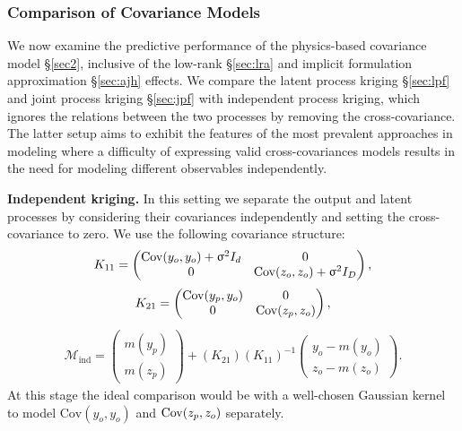 \documentclass[article,ij4uq]{ij4uq}              %
\begin{document}
\subsubsection{Comparison of Covariance Models}\label{sec:512}
\par We now examine the predictive performance of the physics-based covariance model \S \ref{sec2}, inclusive of the low-rank \S \ref{sec:lra} and implicit formulation 
approximation \S \ref{sec:ajh} effects. We compare the latent process kriging \S \ref{sec:lpf} and joint process kriging \S \ref{sec:jpf} with independent process kriging, which ignores the relations between the two processes by removing the cross-covariance. The latter setup aims to exhibit the features of the most prevalent approaches in modeling where a difficulty of expressing valid cross-covariances models results in the need for modeling different observables independently. 
~\\
\par \textbf{Independent kriging.} In this setting we separate the output and latent processes by considering their covariances independently and setting the cross-covariance to zero. We use the following covariance structure:
\begin{align}
    K_{11}=\begin{pmatrix}\mathrm{Cov}(y_{o},y_{o})+\sigma^{2}I_{d} & 0\\0 & {\rm{Cov}}(z_{o},z_{o})+\sigma^{2}I_{D}\end{pmatrix},\label{eq65}
\end{align}
\begin{align}
    K_{21}=\begin{pmatrix}\mathrm{Cov}(y_{p},y_{o}) & 0\\0 & {\rm{Cov}}(z_{p},z_{o})\end{pmatrix},\label{eq66}
\end{align}
\begin{align}
    \mathcal{M}_{\mathrm{ind}}=\begin{pmatrix}m(y_{p})\\m(z_{p})\end{pmatrix}+(K_{21})(K_{11})^{-1}\begin{pmatrix}y_{o}-m(y_{o})\\z_{o}-m(z_{o})\end{pmatrix}.\label{eq67}
\end{align}
At this stage the ideal comparison would be with a well-chosen Gaussian kernel to model $\mathrm{Cov}(y_{o},y_{o})$ and ${\rm{Cov}}(z_{p},z_{o})$ separately. 
\end{document}
